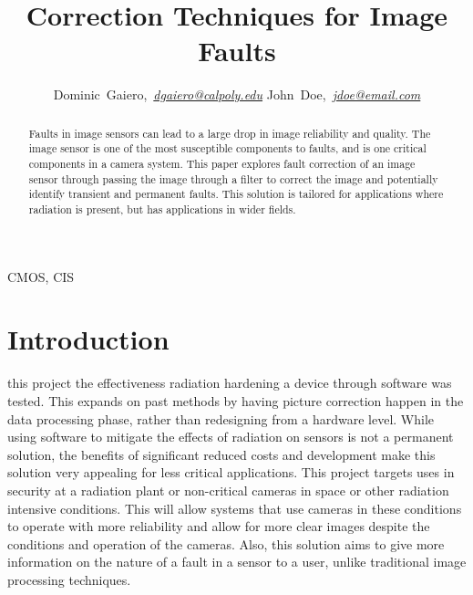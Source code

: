 \documentclass[journal]{IEEEtran}
\begin{document}
\title{Correction Techniques for Image Faults}

\author{Dominic~Gaiero,~\textit{\href{mailto:dgaiero@calpoly.edu}{dgaiero@calpoly.edu}}
        John~Doe,~\textit{\href{mailto:jdoe@email.com}{jdoe@email.com}}}

\maketitle
\begin{abstract}
Faults in image sensors can lead to a large drop in image reliability and quality.  The image sensor is one of the most susceptible components to faults, and is one critical components in a camera system.  This paper explores fault correction of an image sensor through passing the image through a filter to correct the image and potentially identify transient and permanent faults.  This solution is tailored for applications where radiation is present, but has applications in wider fields.  
\end{abstract}



\begin{IEEEkeywords}
CMOS, CIS
\end{IEEEkeywords}

\section{Introduction}%
 this project the effectiveness radiation hardening a device through software was tested.  This expands on past methods by having picture correction happen in the data processing phase, rather than redesigning from a hardware level. While using software to mitigate the effects of radiation on sensors is not a permanent solution, the benefits of significant reduced costs and development make this solution very appealing for less critical applications. This project targets uses in security at a radiation plant or non-critical cameras in space or other radiation intensive conditions. This will allow systems that use cameras in these conditions to operate with more reliability and allow for more clear images despite the conditions and operation of the cameras.  Also, this solution aims to give more information on the nature of a fault in a sensor to a user, unlike traditional image processing techniques.
\end{document}
